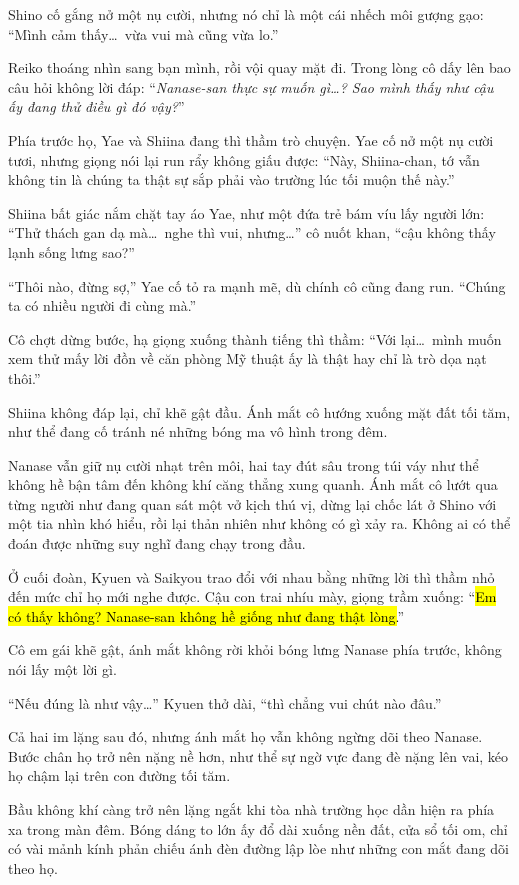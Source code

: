 \documentclass[../main.tex]{subfiles}
\begin{document}
Shino cố gắng nở một nụ cười, nhưng nó chỉ là một cái nhếch môi gượng gạo: ``Mình cảm thấy\dots\ vừa vui mà cũng vừa lo.''

Reiko thoáng nhìn sang bạn mình, rồi vội quay mặt đi. Trong lòng cô dấy lên bao câu hỏi không lời đáp: ``\textit{Nanase-san thực sự muốn gì\dots? Sao mình thấy như cậu ấy đang thử điều gì đó vậy?}''

Phía trước họ, Yae và Shiina đang thì thầm trò chuyện. Yae cố nở một nụ cười tươi, nhưng giọng nói lại run rẩy không giấu được: ``Này, Shiina-chan, tớ vẫn không tin là chúng ta thật sự sắp phải vào trường lúc tối muộn thế này.''

Shiina bất giác nắm chặt tay áo Yae, như một đứa trẻ bám víu lấy người lớn: ``Thử thách gan dạ mà\dots\ nghe thì vui, nhưng\dots'' cô nuốt khan, ``cậu không thấy lạnh sống lưng sao?''

``Thôi nào, đừng sợ,'' Yae cố tỏ ra mạnh mẽ, dù chính cô cũng đang run. ``Chúng ta có nhiều người đi cùng mà.''

Cô chợt dừng bước, hạ giọng xuống thành tiếng thì thầm: ``Với lại\dots\ mình muốn xem thử mấy lời đồn về căn phòng Mỹ thuật ấy là thật hay chỉ là trò dọa nạt thôi.''

Shiina không đáp lại, chỉ khẽ gật đầu. Ánh mắt cô hướng xuống mặt đất tối tăm, như thể đang cố tránh né những bóng ma vô hình trong đêm.

Nanase vẫn giữ nụ cười nhạt trên môi, hai tay đút sâu trong túi váy như thể không hề bận tâm đến không khí căng thẳng xung quanh. Ánh mắt cô lướt qua từng người như đang quan sát một vở kịch thú vị, dừng lại chốc lát ở Shino với một tia nhìn khó hiểu, rồi lại thản nhiên như không có gì xảy ra. Không ai có thể đoán được những suy nghĩ đang chạy trong đầu.

Ở cuối đoàn, Kyuen và Saikyou trao đổi với nhau bằng những lời thì thầm nhỏ đến mức chỉ họ mới nghe được. Cậu con trai nhíu mày, giọng trầm xuống: ``\hl{Em có thấy không? Nanase-san không hề giống như đang thật lòng.}''

Cô em gái khẽ gật, ánh mắt không rời khỏi bóng lưng Nanase phía trước, không nói lấy một lời gì.

``Nếu đúng là như vậy\dots'' Kyuen thở dài, ``thì chẳng vui chút nào đâu.''

Cả hai im lặng sau đó, nhưng ánh mắt họ vẫn không ngừng dõi theo Nanase. Bước chân họ trở nên nặng nề hơn, như thể sự ngờ vực đang đè nặng lên vai, kéo họ chậm lại trên con đường tối tăm.

Bầu không khí càng trở nên lặng ngắt khi tòa nhà trường học dần hiện ra phía xa trong màn đêm. Bóng dáng to lớn ấy đổ dài xuống nền đất, cửa sổ tối om, chỉ có vài mảnh kính phản chiếu ánh đèn đường lập lòe như những con mắt đang dõi theo họ.
\end{document}
